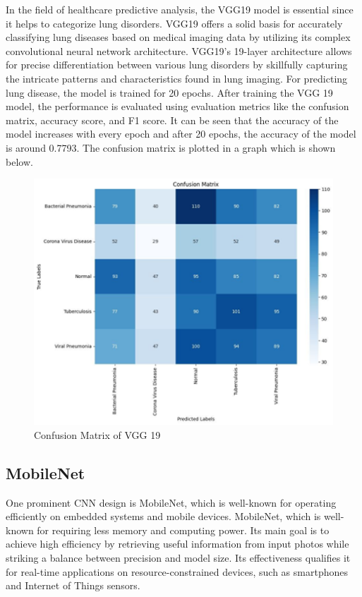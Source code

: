In the field of healthcare predictive analysis, the VGG19 model is essential since it helps to categorize lung disorders. VGG19 offers a solid basis for accurately classifying lung diseases based on medical imaging data by utilizing its complex convolutional neural network architecture. VGG19's 19-layer architecture allows for precise differentiation between various lung disorders by skillfully capturing the intricate patterns and characteristics found in lung imaging. For predicting lung disease, the model is trained for 20 epochs.
After training the VGG 19 model, the performance is evaluated using evaluation metrics like the confusion matrix, accuracy score, and F1 score.  It can be seen that the accuracy of the model increases with every epoch and after 20 epochs, the accuracy of the model is around 0.7793. The confusion matrix is plotted in a graph which is shown below.
\begin{figure}[ht]
    \centering
    \includegraphics[scale=0.8]{figures/Picture2.png}
    \caption{Confusion Matrix of VGG 19}
    \label{fig:chart_a}
\end{figure}
\subsection{MobileNet}
One prominent CNN design is MobileNet, which is well-known for operating efficiently on embedded systems and mobile devices.  MobileNet, which is well-known for requiring less memory and computing power. Its main goal is to achieve high efficiency by retrieving useful information from input photos while striking a balance between precision and model size. Its effectiveness qualifies it for real-time applications on resource-constrained devices, such as smartphones and Internet of Things sensors.

